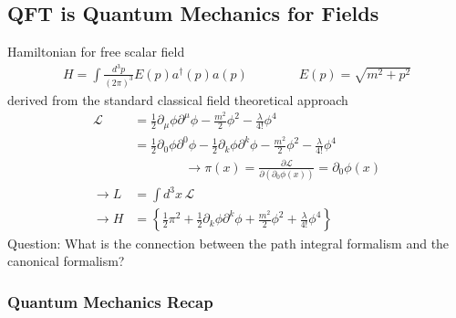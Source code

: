 \documentclass[10pt,a4paper]{article}
\theoremstyle{definition}
\begin{document}
\subsection{QFT is Quantum Mechanics for Fields}
Hamiltonian for free scalar field
\begin{align}
H=\int\frac{d^3p}{(2\pi)^3}E(p)a^\dagger(p)a(p)\qquad\qquad E(p)=\sqrt{m^2+p^2}
\end{align}
derived from the standard classical field theoretical approach
\begin{align}
\mathcal{L}
&=\frac{1}{2}\partial_\mu\phi\partial^\mu\phi-\frac{m^2}{2}\phi^2-\frac{\lambda}{4!}\phi^4\\
&=\frac{1}{2}\partial_0\phi\partial^0\phi-\frac{1}{2}\partial_k\phi\partial^k\phi-\frac{m^2}{2}\phi^2-\frac{\lambda}{4!}\phi^4\\
&\qquad\qquad\rightarrow\pi(x)=\frac{\partial\mathcal{L}}{\partial(\partial_0\phi(x))}=\partial_0\phi(x)\\
\rightarrow L&=\int d^3x\,\mathcal{L}\\
\rightarrow H&=\left\{\frac{1}{2}\pi^2+\frac{1}{2}\partial_k\phi\partial^k\phi+\frac{m^2}{2}\phi^2+\frac{\lambda}{4!}\phi^4\right\}
\end{align}
Question: What is the connection between the path integral formalism and the canonical formalism?

\subsubsection{Quantum Mechanics Recap}
\end{document}
